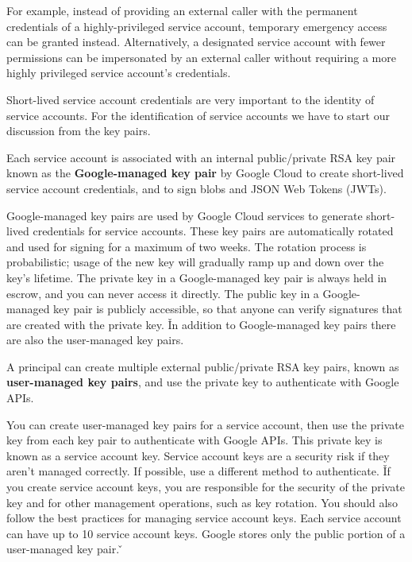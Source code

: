 \be
For example, instead of providing an external caller with the permanent credentials of a highly-privileged service
account, temporary emergency access can be granted instead. Alternatively, a designated service account with fewer
permissions can be impersonated by an external caller without requiring a more highly privileged service account's
credentials.
\ee

Short-lived service account credentials are very important to the identity of service accounts. For the identification
of service accounts we have to start our discussion from the key pairs.

Each service account is associated with an internal public/private RSA key pair known as the \textbf{Google-managed key
pair} by Google Cloud to create short-lived service account credentials, and to sign blobs and JSON Web Tokens (JWTs).
\ed

Google-managed key pairs are used by Google Cloud services to generate short-lived credentials for service accounts.
These key pairs are automatically rotated and used for signing for a maximum of two weeks. The rotation process is
probabilistic; usage of the new key will gradually ramp up and down over the key's lifetime. The private key in a
Google-managed key pair is always held in escrow, and you can never access it directly. The public key in a Google-
managed key pair is publicly accessible, so that anyone can verify signatures that are created with the private key. \v

In addition to Google-managed key pairs there are also the user-managed key pairs.

A principal can create multiple external public/private RSA key pairs, known as \textbf{user-managed key pairs}, and use
the private key to authenticate with Google APIs.
\ed

You can create user-managed key pairs for a service account, then use the private key from each key pair to
authenticate with Google APIs. This private key is known as a service account key. Service account keys are a
security risk if they aren't managed correctly. If possible, use a different method to authenticate. \v

If you create service account keys, you are responsible for the security of the private key and for other management
operations, such as key rotation. You should also follow the best practices for managing service account keys. Each
service account can have up to 10 service account keys. Google stores only the public portion of a user-managed key
pair. \v

